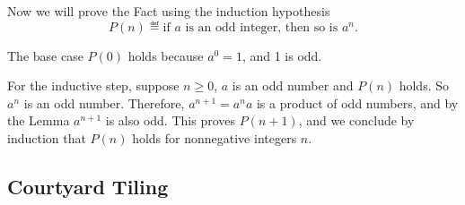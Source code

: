 Now we will prove the Fact using the induction hypothesis
\[
P(n) \eqdef \text{if $a$ is an odd integer, then so is $a^{n}$}.
\]

The base case $P(0)$ holds because $a^{0} =1$, and 1 is odd.

For the inductive step, suppose $n\geq 0$, $a$ is an odd number and $P(n)$
holds.  So $a^n$ is an odd number.  Therefore, $a^{n+1} = a^{n}a$ is a
product of odd numbers, and by the Lemma $a^{n+1}$ is also odd.  This
proves $P(n+1)$, and we conclude by induction that $P(n)$ holds for
nonnegative integers $n$.
\fi

\iffalse
An alternative proof of Lemma~\ref{finmin} that every partial order on a
nonempty finite set has a minimal element can be based on induction.  This
time there is no $n$ mentioned, so we better find one.

We'll use the induction hypothesis
\[
P(n) \eqdef \text{a strict partial order on a set of size $n$ has a minimal
  element}.
\]

As a base case, we'll use $n=1$.  Now $P(1)$ holds because in a
one-element partial order, the element is minimal (and maximal) by
definition.

For the inductive step, assume $P(n)$ holds and consider a strict partial
order, $R$, on a set, $A$, of size $n+1$ for $n \geq 1$.  We will prove
that $A$ has a minimal element.

Now $A$ has 2 or more elements, so pick one and call it $a_0$.  If $a_0$
is a minimal element, then we are done.  Otherwise, let $A'$ be the set $A
- \set{a_0}$ and $R'$ be the relation $R$ restricted to $A'$.

Now it's easy to check that $R'$ is a strict partial order on set $A'$
whose size is $n$.  So by induction, there is an $R'$-minimal element, $m
\in A'$.  We claim that $m$ is also a minimal element of $A$.

Now there is no element $a' \in A'$ such that $a'\,R\,m$, so to prove
$m$ is minimal in $A$,  as long as it is not true that $a_0\,R\, m$

This element $m$ will also be minimal in $A$ unless

Since $a_0$ is not minimal, there is an element $a_1 \in A'$ such that
$a_1\,R\,a_0$.

\fi

\subsection{Courtyard Tiling}

